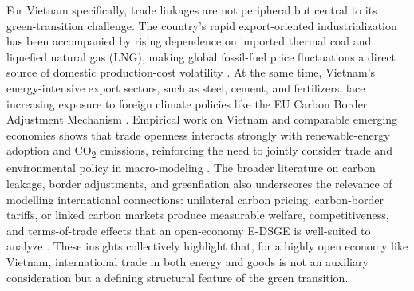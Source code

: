 \documentclass[12pt, a4paper]{article}
\begin{document}
For Vietnam specifically, trade linkages are not peripheral but central to its green-transition challenge. The country's rapid export-oriented industrialization has been accompanied by rising dependence on imported thermal coal and liquefied natural gas (LNG), making global fossil-fuel price fluctuations a direct source of domestic production-cost volatility \citep{iea2023, gso2024}. At the same time, Vietnam's energy-intensive export sectors, such as steel, cement, and fertilizers, face increasing exposure to foreign climate policies like the EU Carbon Border Adjustment Mechanism \citep{ec2023}. Empirical work on Vietnam and comparable emerging economies shows that trade openness interacts strongly with renewable-energy adoption and CO\textsubscript{2} emissions, reinforcing the need to jointly consider trade and environmental policy in macro-modeling \citep{almulali2015, vo2020}. The broader literature on carbon leakage, border adjustments, and greenflation also underscores the relevance of modelling international connections: unilateral carbon pricing, carbon-border tariffs, or linked carbon markets produce measurable welfare, competitiveness, and terms-of-trade effects that an open-economy E-DSGE is well-suited to analyze \citep{fischer2012, bohringer2022}. These insights collectively highlight that, for a highly open economy like Vietnam, international trade in both energy and goods is not an auxiliary consideration but a defining structural feature of the green transition.
\end{document}
